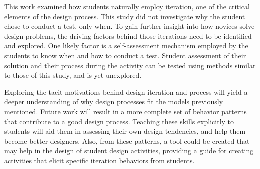 This work examined how students naturally employ iteration, one of the critical elements of the design process. This study did not investigate why the student chose to conduct a test, only when. To gain further insight into how novices solve design problems, the driving factors behind those iterations need to be identified and explored. One likely factor is a self-assessment mechanism employed by the students to know when and how to conduct a test. Student assessment of their solution and their process during the activity can be tested using methods similar to those of this study, and is yet unexplored. 

Exploring the tacit motivations behind design iteration and process will yield a deeper understanding of why design processes fit the models previously mentioned. Future work will result in a more complete set of behavior patterns that contribute to a good design process. Teaching these skills explicitly to students will aid them in assessing their own design tendencies, and help them become better designers. Also, from these patterns, a tool could be created that may help in the design of student design activities, providing a guide for creating activities that elicit specific iteration behaviors from students.


